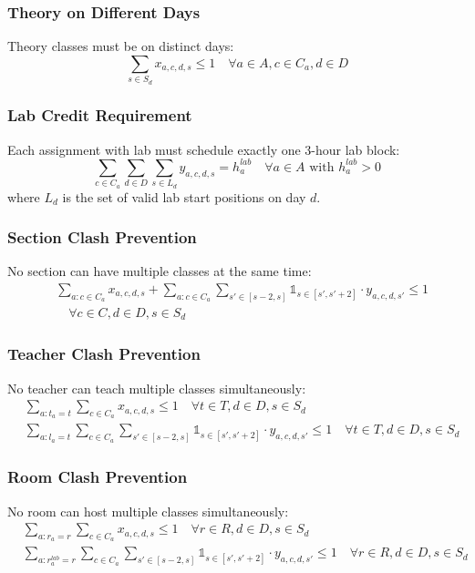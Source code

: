 \documentclass[12pt,a4paper]{article}
\begin{document}
\subsubsection{Theory on Different Days}
Theory classes must be on distinct days:
\begin{equation}
\sum_{s \in S_d} x_{a,c,d,s} \leq 1 \quad \forall a \in A, c \in C_a, d \in D
\end{equation}

\subsubsection{Lab Credit Requirement}
Each assignment with lab must schedule exactly one 3-hour lab block:
\begin{equation}
\sum_{c \in C_a} \sum_{d \in D} \sum_{s \in L_d} y_{a,c,d,s} = h_a^{lab} \quad \forall a \in A \text{ with } h_a^{lab} > 0
\end{equation}
where $L_d$ is the set of valid lab start positions on day $d$.

\subsubsection{Section Clash Prevention}
No section can have multiple classes at the same time:
\begin{align}
&\sum_{a: c \in C_a} x_{a,c,d,s} + \sum_{a: c \in C_a} \sum_{s' \in [s-2, s]} \mathbb{1}_{s \in [s', s'+2]} \cdot y_{a,c,d,s'} \leq 1 \\
&\quad \forall c \in C, d \in D, s \in S_d
\end{align}

\subsubsection{Teacher Clash Prevention}
No teacher can teach multiple classes simultaneously:
\begin{align}
&\sum_{a: t_a = t} \sum_{c \in C_a} x_{a,c,d,s} \leq 1 \quad \forall t \in T, d \in D, s \in S_d \\
&\sum_{a: l_a = t} \sum_{c \in C_a} \sum_{s' \in [s-2, s]} \mathbb{1}_{s \in [s', s'+2]} \cdot y_{a,c,d,s'} \leq 1 \quad \forall t \in T, d \in D, s \in S_d
\end{align}

\subsubsection{Room Clash Prevention}
No room can host multiple classes simultaneously:
\begin{align}
&\sum_{a: r_a = r} \sum_{c \in C_a} x_{a,c,d,s} \leq 1 \quad \forall r \in R, d \in D, s \in S_d \\
&\sum_{a: r_a^{lab} = r} \sum_{c \in C_a} \sum_{s' \in [s-2, s]} \mathbb{1}_{s \in [s', s'+2]} \cdot y_{a,c,d,s'} \leq 1 \quad \forall r \in R, d \in D, s \in S_d
\end{align}
\end{document}
